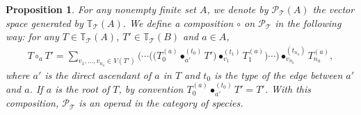 \documentclass[pdftex]{sigma}
\numberwithin{equation}{section}
\newtheorem{Proposition}[Theorem]{Proposition}
 { \theoremstyle{definition}
\newtheorem{Definition}[Theorem]{Definition}
\newtheorem{Note}[Theorem]{Note}
\newtheorem{Example}[Theorem]{Example}
\newtheorem{Remark}[Theorem]{Remark}
\newtheorem{Notation}[Theorem]{Notation}}
\newcommand{\T}{\mathcal{T}}
\newcommand{\bfT}{\mathbb{T}}
\renewcommand{\P}{\mathcal{P}}
\begin{document}
\begin{Proposition}
For any nonempty finite set $A$, we denote by $\P_\T(A)$ the vector space gene\-ra\-ted by $\bfT_\T(A)$.
We define a composition $\circ$ on $\P_\T$ in the following way: for any $T\in \bfT_\T(A)$,
$T'\in \bfT_\T(B)$ and $a\in A$,
\begin{gather*}
T\circ_a T'=\sum_{v_1,\dots,v_{n_a}\in V(T')}
\big(\cdots\big (\big(T_0^{(a)}\bullet_{a'}^{(t_0)} T'\big)\bullet_{v_1}^{(t_1)} T_1^{(a)}\big)\cdots\big)
\bullet_{v_{n_a}}^{(t_{n_a})} T_{n_a}^{(a)},\end{gather*}
where $a'$ is the direct ascendant of $a$ in $T$ and $t_0$ is the type of the edge between $a'$ and $a$.
If $a$ is the root of $T$, by convention $T_0^{(a)}\bullet_{a'}^{(t_0)} T'=T'$.
With this composition, $\P_\T$ is an operad in the category of species.
\end{Proposition}
\end{document}
